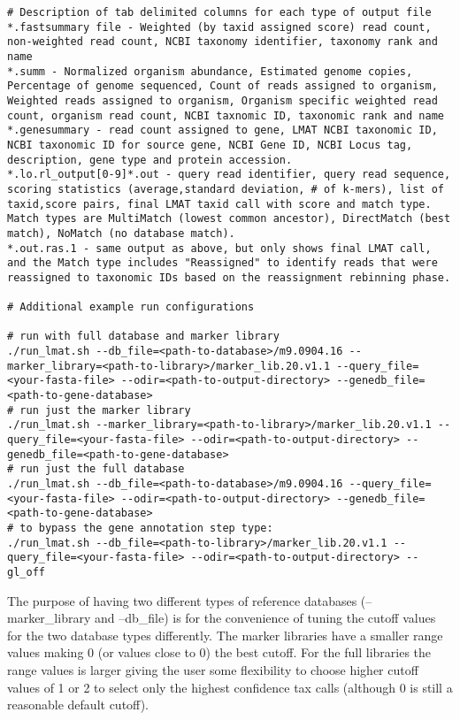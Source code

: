 \documentclass[11pt]{article}
\begin{document}
\begin{verbatim}
# Description of tab delimited columns for each type of output file
*.fastsummary file - Weighted (by taxid assigned score) read count, non-weighted read count, NCBI taxonomy identifier, taxonomy rank and name
*.summ - Normalized organism abundance, Estimated genome copies, Percentage of genome sequenced, Count of reads assigned to organism, Weighted reads assigned to organism, Organism specific weighted read count, organism read count, NCBI taxnomic ID, taxonomic rank and name
*.genesummary - read count assigned to gene, LMAT NCBI taxonomic ID, NCBI taxonomic ID for source gene, NCBI Gene ID, NCBI Locus tag, description, gene type and protein accession.
*.lo.rl_output[0-9]*.out - query read identifier, query read sequence, scoring statistics (average,standard deviation, # of k-mers), list of taxid,score pairs, final LMAT taxid call with score and match type. Match types are MultiMatch (lowest common ancestor), DirectMatch (best match), NoMatch (no database match).
*.out.ras.1 - same output as above, but only shows final LMAT call, and the Match type includes "Reassigned" to identify reads that were reassigned to taxonomic IDs based on the reassignment rebinning phase.

# Additional example run configurations

# run with full database and marker library 
./run_lmat.sh --db_file=<path-to-database>/m9.0904.16 --marker_library=<path-to-library>/marker_lib.20.v1.1 --query_file=<your-fasta-file> --odir=<path-to-output-directory> --genedb_file=<path-to-gene-database>
# run just the marker library
./run_lmat.sh --marker_library=<path-to-library>/marker_lib.20.v1.1 --query_file=<your-fasta-file> --odir=<path-to-output-directory> --genedb_file=<path-to-gene-database>
# run just the full database
./run_lmat.sh --db_file=<path-to-database>/m9.0904.16 --query_file=<your-fasta-file> --odir=<path-to-output-directory> --genedb_file=<path-to-gene-database>
# to bypass the gene annotation step type:
./run_lmat.sh --db_file=<path-to-library>/marker_lib.20.v1.1 --query_file=<your-fasta-file> --odir=<path-to-output-directory> --gl_off
\end{verbatim}

The purpose of having two different types of reference databases (--marker_library and --db_file) is for the convenience of tuning the cutoff values for the two database types differently. The marker libraries have a smaller range values making 0 (or values close to 0) the best cutoff.  For the full libraries the range values is larger giving the user some flexibility to choose higher cutoff values of 1 or 2 to select only the highest confidence tax calls (although 0 is still a reasonable default cutoff).
\end{document}
